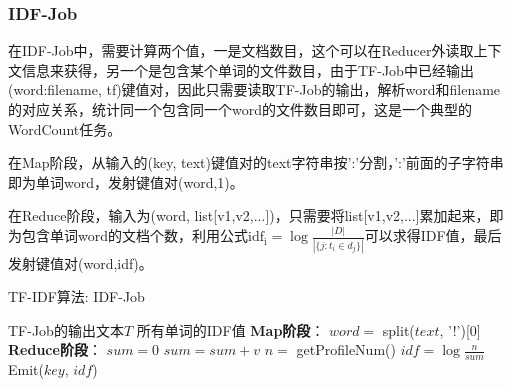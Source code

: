 \documentclass[lang=cn,11pt]{elegantpaper}
\begin{document}
\subsubsection{IDF-Job}
在IDF-Job中，需要计算两个值，一是文档数目，这个可以在Reducer外读取上下文信息来获得，另一个是包含某个单词的文件数目，由于TF-Job中已经输出(word:filename, tf)键值对，因此只需要读取TF-Job的输出，解析word和filename的对应关系，统计同一个包含同一个word的文件数目即可，这是一个典型的WordCount任务。\par
在Map阶段，从输入的(key, text)键值对的text字符串按':'分割，':'前面的子字符串即为单词word，发射键值对(word,1)。\par
在Reduce阶段，输入为(word, list[v1,v2,...])，只需要将list[v1,v2,...]累加起来，即为包含单词word的文档个数，利用公式$\mathrm{idf_{i}} =  \log \frac{|D|}{|\{j: t_{i} \in d_{j}\}|}$可以求得IDF值，最后发射键值对(word,idf)。\par
\begin{algorithm}[H]  
  \caption{TF-IDF算法: IDF-Job}  
  \label{alg:Framwork}
  \begin{algorithmic}[1]
    \Require
    TF-Job的输出文本$T$
    \Ensure
    所有单词的IDF值
    \State \textbf{Map阶段}：
      \State $word=$ split($text$, '!')[0]
    \EndFunction
    \State \textbf{Reduce阶段}：
      \State $sum=0$
        \State $sum = sum + v$
      \EndFor
      \State $n=$ getProfileNum()
      \State $idf = \log\frac{n}{sum}$
      \State Emit($key$, $idf$)
    \EndFunction
  \end{algorithmic}
\end{algorithm}
\end{document}
